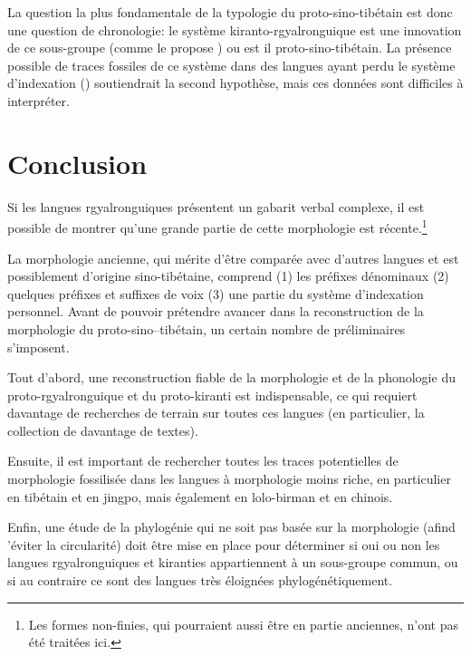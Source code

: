 \documentclass[oldfontcommands,oneside,a4paper,11pt]{article}
\begin{document}
 La question la plus fondamentale de la typologie du proto-sino-tibétain est donc une question de chronologie: le système kiranto-rgyalronguique est une innovation de ce sous-groupe (comme le propose \citealt{lapolla03}) ou est il proto-sino-tibétain. La présence possible de traces fossiles de ce système dans des langues ayant perdu le système d'indexation (\citealt{jacques10zos}) soutiendrait la second hypothèse, mais ces données sont difficiles à interpréter.
 
 
\section{Conclusion}
Si les langues rgyalronguiques présentent un gabarit verbal complexe, il est possible de montrer qu'une grande partie de cette morphologie est récente.\footnote{Les formes non-finies, qui pourraient aussi être en partie anciennes, n'ont pas été traitées ici.}

La morphologie ancienne, qui mérite d'être comparée avec d'autres langues et est possiblement d'origine sino-tibétaine, comprend (1) les préfixes dénominaux (2) quelques préfixes et suffixes de voix (3) une partie du système d'indexation personnel. Avant de pouvoir prétendre avancer dans la reconstruction de la morphologie du proto-sino--tibétain, un certain nombre de préliminaires s'imposent.

Tout d'abord, une reconstruction fiable de la morphologie et de la phonologie du proto-rgyalronguique et du proto-kiranti est indispensable, ce qui requiert davantage de recherches de terrain sur toutes ces langues (en particulier, la collection de davantage de textes).

Ensuite, il est important de rechercher toutes les traces potentielles de morphologie fossilisée dans les langues à morphologie moins riche, en particulier en tibétain et en jingpo, mais également en lolo-birman et en chinois.

 Enfin, une étude de la phylogénie qui ne soit pas basée sur la morphologie (afind 'éviter la circularité) doit être mise en place pour déterminer si oui ou non les langues rgyalronguiques et kiranties appartiennent à un sous-groupe  commun, ou si au contraire ce sont des langues très éloignées phylogénétiquement.
 


\end{document}
